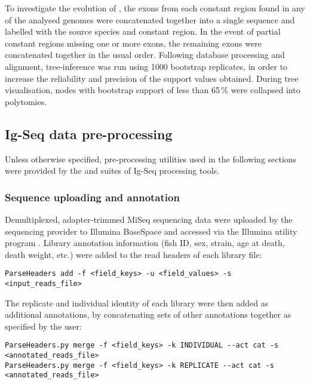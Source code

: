 \noindent To investigate the evolution of , the  exons from each  constant region found in any of the analysed genomes were concatenated together into a single sequence and labelled with the source species and constant region. In the event of partial constant regions missing one or more \cz{} exons, the remaining exons were concatenated together in the usual order. Following database processing and alignment,  tree-inference was run using 1000 bootstrap replicates, in order to increase the reliability and precision of the support values obtained. During tree visualisation, nodes with bootstrap support of less than 65\,\% were collapsed into polytomies.

\subsection{Ig-Seq data pre-processing}
\label{sec:methods_comp_igpreproc}

Unless otherwise specified, pre-processing utilities used in the following sections were provided by the  \parencite{vanderheiden2014presto} and  \parencite{gupta2015changeo} suites of Ig-Seq processing tools.

\subsubsection{Sequence uploading and annotation}
\label{sec:methods_comp_igpreproc_annot}

Demultiplexed, adapter-trimmed MiSeq sequencing data were uploaded by the sequencing provider to Illumina BaseSpace and accessed via the Illumina utility program . Library annotation information (fish ID, sex, strain, age at death, death weight, etc.) were added to the read headers of each library  file:

\begin{lstlisting}
ParseHeaders add -f <field_keys> -u <field_values> -s <input_reads_file>
\end{lstlisting}

\noindent The replicate and individual identity of each library were then added as additional annotations, by concatenating sets of other annotations together as specified by the user:

\begin{lstlisting}
ParseHeaders.py merge -f <field_keys> -k INDIVIDUAL --act cat -s <annotated_reads_file>
ParseHeaders.py merge -f <field_keys> -k REPLICATE --act cat -s <annotated_reads_file>
\end{lstlisting}

